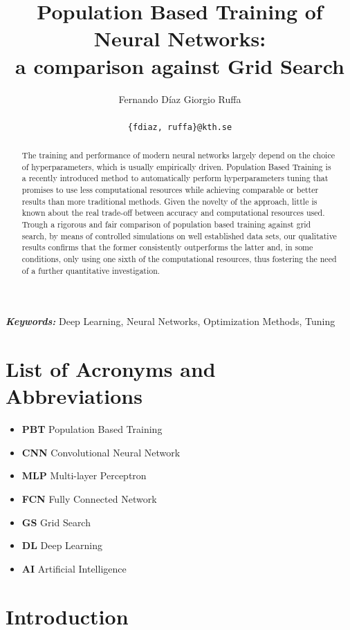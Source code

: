 \documentclass{article}
\title{Population Based Training of Neural Networks:\\ a comparison against Grid Search}
\author{
  Fernando Díaz\hspace{2em} Giorgio Ruffa\\\\
  \texttt{\{fdiaz, ruffa\}@kth.se} \\
}
\providecommand{\keywords}[1]{\textbf{\textit{Keywords:}} #1}
\begin{document}

\maketitle
\thispagestyle{fancy}

\begin{abstract}
The training and performance of modern neural networks largely depend on the choice of hyperparameters, which is usually empirically driven. Population Based Training is a recently introduced method to automatically perform hyperparameters tuning that promises to use less computational resources while achieving comparable or better results than more traditional methods. Given the novelty of the approach, little is known about the real trade-off between accuracy and computational resources used.
Trough a rigorous and fair comparison of population based training against grid search, by means of controlled simulations on well established data sets, our qualitative results confirms that the former consistently outperforms the latter and, in some conditions, only using one sixth of the computational resources, thus fostering the need of a further quantitative investigation.

\end{abstract}

\keywords{Deep Learning, Neural Networks, Optimization Methods, Tuning}


\tableofcontents


\section*{List of Acronyms and Abbreviations}
\label{list-of-acronyms-and-abbreviations}
\begin{itemize}
    \item \textbf{PBT} Population Based Training
    \item \textbf{CNN} Convolutional Neural Network
    \item \textbf{MLP} Multi-layer Perceptron
    \item \textbf{FCN} Fully Connected Network
    \item \textbf{GS} Grid Search
    \item \textbf{DL} Deep Learning
    \item \textbf{AI} Artificial Intelligence
\end{itemize}



\section{Introduction}
	\label{sect:introduction}
	
\end{document}
